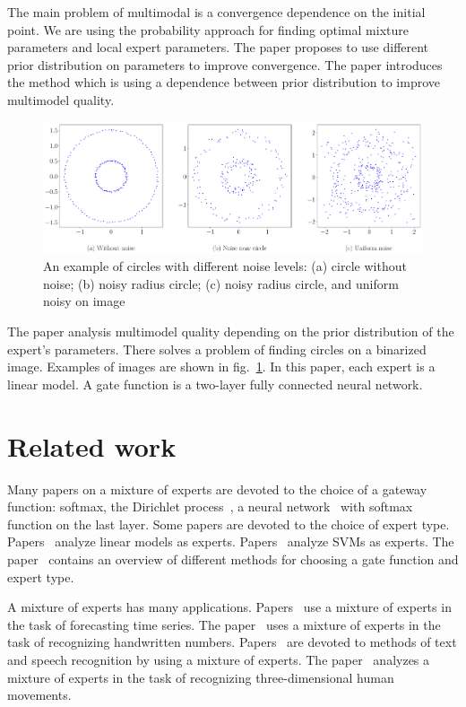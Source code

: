 \documentclass[12pt, twoside]{article}
\begin{document}
The main problem of multimodal is a convergence dependence on the initial point.
We are using the probability approach for finding optimal mixture parameters and local expert parameters.
The paper proposes to use different prior distribution on parameters to improve convergence.
The paper introduces the method which is using a dependence between prior distribution to improve multimodel quality.

\begin{figure}[h!t]\center
\includegraphics[width=1\textwidth]{result_eng/statment}
\caption{An example of circles with different noise levels: (a) circle without noise; (b) noisy radius circle; (c) noisy radius circle, and uniform noisy on image}
\label{example:1}
\end{figure}

The paper analysis multimodel quality depending on the prior distribution of the expert's parameters.
There solves a problem of finding circles on a binarized image.
Examples of images are shown in fig.~\ref{example:1}.
In this paper, each expert is a linear model.
A gate function is a two-layer fully connected neural network.

\section{Related work}
Many papers on a mixture of experts are devoted to the choice of a gateway function: softmax, the Dirichlet process~\cite{Edward2002}, a neural network~\cite{Shazeer2017} with softmax function on the last layer.
Some papers are devoted to the choice of expert type. 
Papers~\cite{Jordan1994, Jordan1991} analyze linear models as experts.
Papers~\cite{Lima2007, Cao2003} analyze SVMs as experts.
The paper~\cite{Yuksel2012} contains an overview of different methods for choosing a gate function and expert type.

A mixture of experts has many applications.
Papers~\cite{Yumlu2003, Cheung1995, Weigend2000} use a mixture of experts in the task of forecasting time series.
The paper~\cite{Ebrahimpour2009} uses a mixture of experts in the task of recognizing handwritten numbers.
Papers~\cite{Estabrooks2001, Mossavat2010, Peng1996, Tuerk2001}  are devoted to methods of text and speech recognition by using a mixture of experts.
The paper~\cite{Sminchisescu2007} analyzes a mixture of experts in the task of recognizing three-dimensional human movements.
\end{document}
